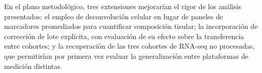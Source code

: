 En el plano metodológico, tres extensiones mejorarían el rigor de los análisis
presentados: el empleo de deconvolución celular en lugar de paneles de
marcadores promediados para cuantificar composición tisular; la incorporación de
corrección de lote explícita, con evaluación de su efecto sobre la transferencia
entre cohortes; y la recuperación de las tres cohortes de RNA-seq no procesadas,
que permitirían por primera vez evaluar la generalización entre plataformas de
medición distintas.
